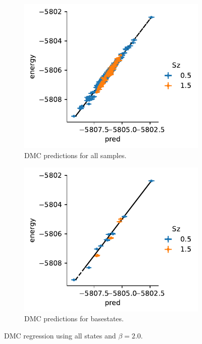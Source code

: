 \documentclass{article}
\begin{document}
\begin{figure}
\centering
\begin{subfigure}{.5\textwidth}
  \centering
  \includegraphics[width=\linewidth]{../qwalk/ub3lyp_s1_/analysis/fit.pdf}
  \caption{DMC predictions for all samples.}
  \label{fig:sub6}
\end{subfigure}%
\begin{subfigure}{.5\textwidth}
  \centering
  \includegraphics[width=\linewidth]{../qwalk/ub3lyp_s1_/analysis/fit_baseonly.pdf}
  \caption{DMC predictions for basestates. }
  \label{fig:sub7}
\end{subfigure}
\label{fig:test2}
\caption{DMC regression using all states and $\beta=2.0$.}
\end{figure}
\end{document}
